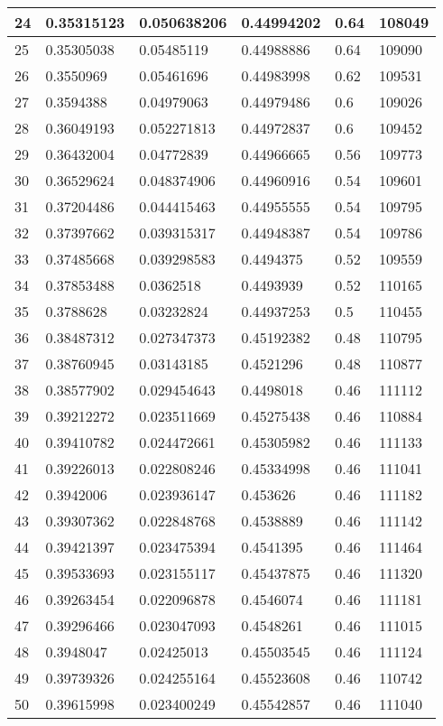 \begin{longtable}{|l|l|l|l|l|l|}
24 & 0.35315123 & 0.050638206 & 0.44994202 & 0.64 & 108049 \\ \hline 
25 & 0.35305038 & 0.05485119 & 0.44988886 & 0.64 & 109090 \\ \hline 
26 & 0.3550969 & 0.05461696 & 0.44983998 & 0.62 & 109531 \\ \hline 
27 & 0.3594388 & 0.04979063 & 0.44979486 & 0.6 & 109026 \\ \hline 
28 & 0.36049193 & 0.052271813 & 0.44972837 & 0.6 & 109452 \\ \hline 
29 & 0.36432004 & 0.04772839 & 0.44966665 & 0.56 & 109773 \\ \hline 
30 & 0.36529624 & 0.048374906 & 0.44960916 & 0.54 & 109601 \\ \hline 
31 & 0.37204486 & 0.044415463 & 0.44955555 & 0.54 & 109795 \\ \hline 
32 & 0.37397662 & 0.039315317 & 0.44948387 & 0.54 & 109786 \\ \hline 
33 & 0.37485668 & 0.039298583 & 0.4494375 & 0.52 & 109559 \\ \hline 
34 & 0.37853488 & 0.0362518 & 0.4493939 & 0.52 & 110165 \\ \hline 
35 & 0.3788628 & 0.03232824 & 0.44937253 & 0.5 & 110455 \\ \hline 
36 & 0.38487312 & 0.027347373 & 0.45192382 & 0.48 & 110795 \\ \hline 
37 & 0.38760945 & 0.03143185 & 0.4521296 & 0.48 & 110877 \\ \hline 
38 & 0.38577902 & 0.029454643 & 0.4498018 & 0.46 & 111112 \\ \hline 
39 & 0.39212272 & 0.023511669 & 0.45275438 & 0.46 & 110884 \\ \hline 
40 & 0.39410782 & 0.024472661 & 0.45305982 & 0.46 & 111133 \\ \hline 
41 & 0.39226013 & 0.022808246 & 0.45334998 & 0.46 & 111041 \\ \hline 
42 & 0.3942006 & 0.023936147 & 0.453626 & 0.46 & 111182 \\ \hline 
43 & 0.39307362 & 0.022848768 & 0.4538889 & 0.46 & 111142 \\ \hline 
44 & 0.39421397 & 0.023475394 & 0.4541395 & 0.46 & 111464 \\ \hline 
45 & 0.39533693 & 0.023155117 & 0.45437875 & 0.46 & 111320 \\ \hline 
46 & 0.39263454 & 0.022096878 & 0.4546074 & 0.46 & 111181 \\ \hline 
47 & 0.39296466 & 0.023047093 & 0.4548261 & 0.46 & 111015 \\ \hline 
48 & 0.3948047 & 0.02425013 & 0.45503545 & 0.46 & 111124 \\ \hline 
49 & 0.39739326 & 0.024255164 & 0.45523608 & 0.46 & 110742 \\ \hline 
50 & 0.39615998 & 0.023400249 & 0.45542857 & 0.46 & 111040 \\ \hline 
\end{longtable}